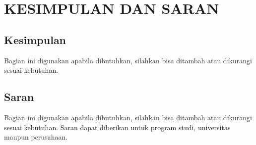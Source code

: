 
\chapter[KESIMPULAN DAN SARAN]{\\ KESIMPULAN DAN SARAN}

\section{Kesimpulan}
Bagian ini digunakan apabila dibutuhkan, silahkan bisa ditambah atau dikurangi sesuai kebutuhan.

\section{Saran}
Bagian ini digunakan apabila dibutuhkan, silahkan bisa ditambah atau dikurangi sesuai kebutuhan. Saran dapat diberikan untuk program studi, universitas maupun perusahaan.